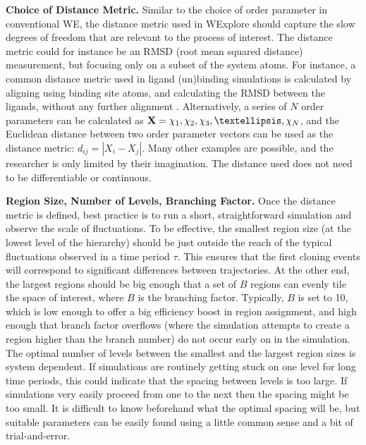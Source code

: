 \documentclass[9pt,tutorial]{livecoms}
\begin{document}
\textbf{Choice of Distance Metric.} Similar to the choice of order parameter in conventional WE, the distance metric used in WExplore should capture the slow degrees of freedom that are relevant to the process of interest. 
The distance metric could for instance be an RMSD (root mean squared distance) measurement, but focusing only on a subset of the system atoms. 
For instance, a common distance metric used in ligand (un)binding simulations is calculated by aligning using binding site atoms, and calculating the RMSD between the ligands, without any further alignment \citep{Dickson2016}. 
Alternatively, a series of $N$ order parameters can be calculated as ${\bf X} = {\chi_1, \chi_2, \chi_3, …, \chi_N}$, and the Euclidean distance between two order parameter vectors can be used as the distance metric: $d_{ij} = |X_i - X_j|$. 
Many other examples are possible, and the researcher is only limited by their imagination. 
The distance used does not need to be differentiable or continuous.

\textbf{Region Size, Number of Levels, Branching Factor.} Once the distance metric is defined, best practice is to run a short, straightforward simulation and observe the scale of fluctuations. 
To be effective, the smallest region size (at the lowest level of the hierarchy) should be just outside the reach of the typical fluctuations observed in a time period $\tau$. 
This ensures that the first cloning events will correspond to significant differences between trajectories. 
At the other end, the largest regions should be big enough that a set of $B$ regions can evenly tile the space of interest, where $B$ is the branching factor. 
Typically, $B$ is set to 10, which is low enough to offer a big efficiency boost in region assignment, and high enough that branch factor overflows (where the simulation attempts to create a region higher than the branch number) do not occur early on in the simulation. 
The optimal number of levels between the smallest and the largest region sizes is system dependent. 
If simulations are routinely getting stuck on one level for long time periods, this could indicate that the spacing between levels is too large. 
If simulations very easily proceed from one to the next then the spacing might be too small. 
It is difficult to know beforehand what the optimal spacing will be, but suitable parameters can be easily found using a little common sense and a bit of trial-and-error.
\end{document}
